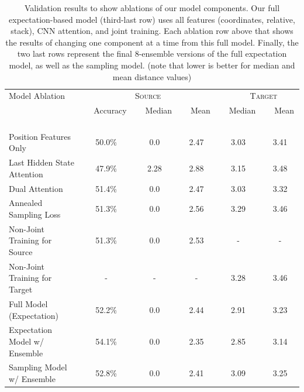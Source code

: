 \documentclass[letterpaper]{article} %
\begin{document}
\begin{table}[ht!]
\begin{center}
\begin{tabular}{|l|ccc|cc|}
\hline
\multirow{1}{*}{Model Ablation } & \multicolumn{3}{c|}{\textsc{Source}} & \multicolumn{2}{c|}{\textsc{ \ \ \ Target}} \\
  &  \ \ Accuracy \ \  & \ \  Median \ \  &  \ \ Mean  \ \  & \ \  Median \ \  &  \ \ Mean \ \  \\
\hline
Position Features Only				&	50.0\%			&	0.0		&	2.47	&	3.03	&	3.41	\\
\hline
Last Hidden State Attention	& 	47.9\%	&	2.28	&	2.88	&	3.15	&	3.48	\\
Dual Attention 	& 	51.4\%	&	0.0		&	2.47	&	3.03	&	3.32	\\
\hline
Annealed Sampling Loss			&	51.3\%		&	0.0	&	2.56	&	3.29	&	3.46	\\
\hline
Non-Joint Training for Source \ \ \ \ \ \ 	&	51.3\%		&	0.0			&	2.53	&	-	&	-	\\
Non-Joint Training for Target	&	-		&	-			& -	&	3.28	&	3.46	\\
\hline
Full Model (Expectation)	&	52.2\%	&	0.0		&	2.44	&	2.91	&	3.23	\\
\hline
\hline
Expectation Model w/ Ensemble	&	54.1\%	&	0.0		&	2.35	&	2.85	&	3.14	\\
Sampling Model w/ Ensemble	&	52.8\%	&	0.0		&	2.41	&	3.09	&	3.25	\\
\hline
\end{tabular}
\end{center}
\caption{Validation results to show ablations of our model components. Our full expectation-based model (third-last row) uses all features (coordinates, relative, stack), CNN attention, and joint training. Each ablation row above that shows the results of changing one component at a time from this full model. Finally, the two last rows represent the final 8-ensemble versions of the full expectation model, as well as the sampling model. (note that lower is better for median and mean distance values)}
\label{table:valid}
\end{table}
\end{document}
